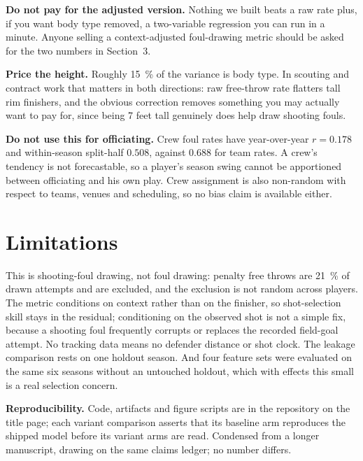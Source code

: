 \documentclass[10pt,letterpaper]{article}
\begin{document}
\textbf{Do not pay for the adjusted version.} Nothing we built beats a raw rate
plus, if you want body type removed, a two-variable regression you can run in a
minute. Anyone selling a context-adjusted foul-drawing metric should be asked for
the two numbers in Section~3.

\textbf{Price the height.} Roughly \SI{15}{\percent} of the variance is body
type. In scouting and contract work that matters in both directions: raw
free-throw rate flatters tall rim finishers, and the obvious correction removes
something you may actually want to pay for, since being 7 feet tall genuinely does
help draw shooting fouls.

\textbf{Do not use this for officiating.} Crew foul rates have year-over-year
$r = 0.178$ and within-season split-half $0.508$, against $0.688$ for team rates.
A crew's tendency is not forecastable, so a player's season swing cannot be
apportioned between officiating and his own play. Crew assignment is also
non-random with respect to teams, venues and scheduling, so no bias claim is
available either.

\section{Limitations}

This is shooting-foul drawing, not foul drawing: penalty free throws are
\SI{21}{\percent} of drawn attempts and are excluded, and the exclusion is not
random across players. The metric conditions on context rather than on the
finisher, so shot-selection skill stays in the residual; conditioning on the
observed shot is not a simple fix, because a shooting foul frequently corrupts or
replaces the recorded field-goal attempt. No tracking data means no defender
distance or shot clock. The leakage comparison rests on one holdout season. And
four feature sets were evaluated on the same six seasons without an untouched
holdout, which with effects this small is a real selection concern.

\vspace{1mm}
\noindent\footnotesize
\textbf{Reproducibility.} Code, artifacts and figure scripts are in the repository
on the title page; each variant comparison asserts that its baseline arm
reproduces the shipped model before its variant arms are read. Condensed from a
longer manuscript, drawing on the same claims ledger; no number differs.


\end{document}
